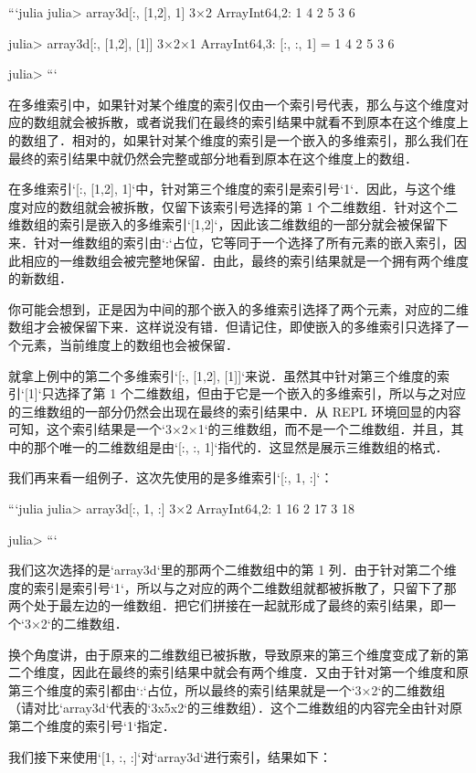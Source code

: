 ```julia
julia> array3d[:, [1,2], 1]
3×2 Array{Int64,2}:
 1  4
 2  5
 3  6

julia> array3d[:, [1,2], [1]]
3×2×1 Array{Int64,3}:
[:, :, 1] =
 1  4
 2  5
 3  6

julia> 
```

在多维索引中，如果针对某个维度的索引仅由一个索引号代表，那么与这个维度对应的数组就会被拆散，或者说我们在最终的索引结果中就看不到原本在这个维度上的数组了．相对的，如果针对某个维度的索引是一个嵌入的多维索引，那么我们在最终的索引结果中就仍然会完整或部分地看到原本在这个维度上的数组．

在多维索引`[:, [1,2], 1]`中，针对第三个维度的索引是索引号`1`．因此，与这个维度对应的数组就会被拆散，仅留下该索引号选择的第 1 个二维数组．针对这个二维数组的索引是嵌入的多维索引`[1,2]`，因此该二维数组的一部分就会被保留下来．针对一维数组的索引由`:`占位，它等同于一个选择了所有元素的嵌入索引，因此相应的一维数组会被完整地保留．由此，最终的索引结果就是一个拥有两个维度的新数组．

你可能会想到，正是因为中间的那个嵌入的多维索引选择了两个元素，对应的二维数组才会被保留下来．这样说没有错．但请记住，即使嵌入的多维索引只选择了一个元素，当前维度上的数组也会被保留．

就拿上例中的第二个多维索引`[:, [1,2], [1]]`来说．虽然其中针对第三个维度的索引`[1]`只选择了第 1 个二维数组，但由于它是一个嵌入的多维索引，所以与之对应的三维数组的一部分仍然会出现在最终的索引结果中．从 REPL 环境回显的内容可知，这个索引结果是一个`3×2×1`的三维数组，而不是一个二维数组．并且，其中的那个唯一的二维数组是由`[:, :, 1]`指代的．这显然是展示三维数组的格式．

我们再来看一组例子．这次先使用的是多维索引`[:, 1, :]`：

```julia
julia> array3d[:, 1, :]
3×2 Array{Int64,2}:
 1  16
 2  17
 3  18

julia> 
```

我们这次选择的是`array3d`里的那两个二维数组中的第 1 列．由于针对第二个维度的索引是索引号`1`，所以与之对应的两个二维数组就都被拆散了，只留下了那两个处于最左边的一维数组．把它们拼接在一起就形成了最终的索引结果，即一个`3×2`的二维数组．

换个角度讲，由于原来的二维数组已被拆散，导致原来的第三个维度变成了新的第二个维度，因此在最终的索引结果中就会有两个维度．又由于针对第一个维度和原第三个维度的索引都由`:`占位，所以最终的索引结果就是一个`3×2`的二维数组（请对比`array3d`代表的`3x5x2`的三维数组）．这个二维数组的内容完全由针对原第二个维度的索引号`1`指定．

我们接下来使用`[1, :, :]`对`array3d`进行索引，结果如下：

